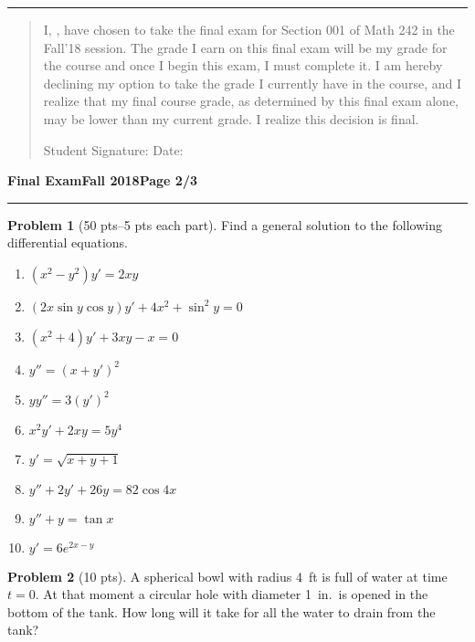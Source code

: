 \documentclass[12pt]{article}
\theoremstyle{definition}
\newtheorem{problem}{Problem}
\begin{document}
\hrule

\vspace{0.6cm}

\begin{quotation}
\noindent I, \makebox[8cm]{\hrulefill}, have chosen to take the final exam for Section 001 of Math 242 in the Fall'18 session.  The grade I earn on this final exam will be my grade for the course and once I begin this exam, I must complete it.  I am hereby declining my option to take the grade I currently have in the course, and I realize that my final course grade, as determined by this final exam alone, may be lower than my current grade.  I realize this decision is final.

\vspace{1cm}

\noindent Student Signature: \makebox[8cm]{\hrulefill} Date: \makebox[3cm]{\hrulefill}


\end{quotation}
\newpage

\hfill{\large\bf Final Exam}\hfill{\large\bf Fall 2018}\hfill{\large\bf Page 2/3}\hrule

\bigskip
\begin{problem}[50 pts--5 pts each part]
Find a general solution to the following differential equations.
\begin{enumerate}
\item $(x^2-y^2)y'=2xy$
\item $(2x\sin y \cos y )y'+4x^2+\sin^2 y = 0$
\item $(x^2+4)y'+3xy-x=0$
\item $y''=(x+y')^2$
\item $yy''=3(y')^2$
\item $x^2y'+2xy=5y^4$
\item $y'=\sqrt{x+y+1}$
\item $y''+2y'+26y=82\cos 4x$
\item $y''+y=\tan x$
\item $y'=6e^{2x-y}$
\end{enumerate}
\end{problem}

\begin{problem}[10 pts]
A spherical bowl with radius 4~ft is full of water at time $t=0$.  At that moment a circular hole with diameter 1~in.~is opened in the bottom of the tank.  How long will it take for all the water to drain from the tank?
\end{problem}
\end{document}
